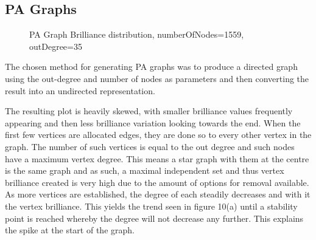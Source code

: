\documentclass[12pt,a4paper]{article}
\begin{document}
\subsection{PA Graphs}
\begin{figure}[h]
	\centering
	\qquad
	\caption{PA Graph Brilliance distribution, numberOfNodes=1559, outDegree=35}
	\label{both}
\end{figure}
The chosen method for generating PA graphs was to produce a directed graph using the out-degree and number of nodes as parameters and then converting the result into an undirected representation.

The resulting plot is heavily skewed, with smaller brilliance values frequently appearing and then less brilliance variation looking towards the end. When the first few vertices are allocated edges, they are done so to every other vertex in the graph. The number of such vertices is equal to the out degree and such nodes have a maximum vertex degree. This means a star graph with them at the centre is the same graph and as such, a maximal independent set and thus vertex brilliance created is very high due to the amount of options for removal available. As more vertices are established, the degree of each steadily decreases and with it the vertex brilliance. This yields the trend seen in figure 10(a) until a stability point is reached whereby the degree will not decrease any further. This explains the spike at the start of the graph. 
\end{document}

